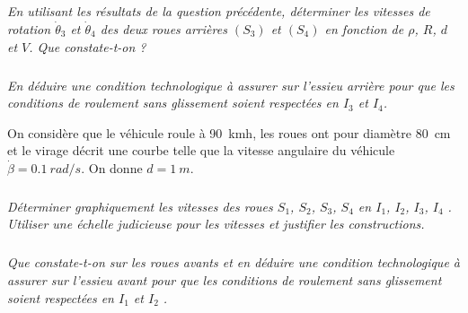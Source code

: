 \documentclass[10pt,fleqn]{article} %
\begin{document}
\begin{multicols}{2}
\ifprof%
\begin{corrige}
\end{corrige}\else\fi
\subparagraph{}
\textit{En utilisant les résultats de la question précédente, déterminer les vitesses de rotation $\dot{\theta}_3$ et $\dot{\theta}_4$ des deux roues arrières $(S_3)$ et $(S_4)$ en fonction de $\rho$, $R$, $d$ et $V$. Que constate-t-on ? }
\ifprof%
\begin{corrige}
\end{corrige}\else\fi
\subparagraph{}
\textit{En déduire une condition technologique à assurer sur l'essieu arrière pour que les conditions de roulement sans glissement soient respectées en $I_3$ et $I_4$. }
\ifprof%
\begin{corrige}
\end{corrige}\else\fi

On considère que le véhicule roule à \SI{90}{km}{h}, les roues ont pour diamètre \SI{80}{cm} et le virage décrit une courbe telle que la vitesse angulaire du véhicule  $\dot{\beta}=\SI{0,1}{rad/s}$. On donne $d=\SI{1}{m}$. 

\subparagraph{}
\textit{Déterminer graphiquement les vitesses des roues $S_1$, $S_2$, $S_3$, $S_4$ en $I_1$, $I_2$, $I_3$, $I_4$ . Utiliser une échelle judicieuse pour les vitesses et  justifier les constructions.}
\ifprof%
\begin{corrige}
\end{corrige}\else\fi
\subparagraph{}
\textit{Que constate-t-on sur les roues avants et en déduire une condition technologique à assurer sur l'essieu avant pour que les conditions de roulement sans glissement soient respectées en $I_1$ et $I_2$ . }
\ifprof%
\begin{corrige}
\end{corrige}\else\fi





\ifprof
\else
\end{multicols}
\fi

\end{document}
